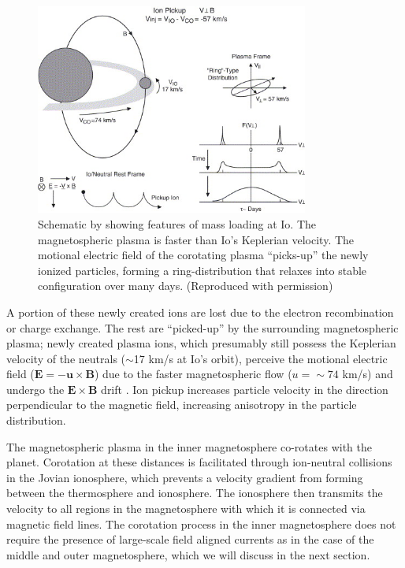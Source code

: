 \begin{figure}
    \centering
    \includegraphics[width=0.8\textwidth]{images1/chp1-io-massloading.jpg}
    \caption{Schematic by \protect{} showing features of mass loading at Io. The magnetospheric plasma is faster than Io's Keplerian velocity. The motional electric field of the corotating plasma ``picks-up'' the newly ionized particles, forming a ring-distribution that relaxes into stable configuration over many days. (Reproduced with permission)}
    \label{fig:io-torus-schematic}
\end{figure}

A portion of these newly created ions are lost due to the electron recombination or charge exchange. The rest are ``picked-up'' by the surrounding magnetospheric plasma; newly created plasma ions, which presumably still possess the Keplerian velocity of the neutrals ($\sim$17 km/s at Io's orbit), perceive the motional electric field ($\mathbf{E} = -\mathbf{u} \times \mathbf{B}$) due to the faster magnetospheric flow ($u=\sim74$ km/s) and undergo the $\mathbf{E} \times \mathbf{B}$ drift \cite{Russell2005InteractionEnvironments}. Ion pickup increases particle velocity in the direction perpendicular to the magnetic field, increasing anisotropy in the particle distribution. 

The magnetospheric plasma in the inner magnetosphere co-rotates with the planet. Corotation at these distances is facilitated through ion-neutral collisions in the Jovian ionosphere, which prevents a velocity gradient from forming between the thermosphere and ionosphere. The ionosphere then transmits the velocity to all regions in the magnetosphere with which it is connected via magnetic field lines. The corotation process in the inner magnetosphere does not require the presence of large-scale field aligned currents as in the case of the middle and outer magnetosphere, which we will discuss in the next section.

